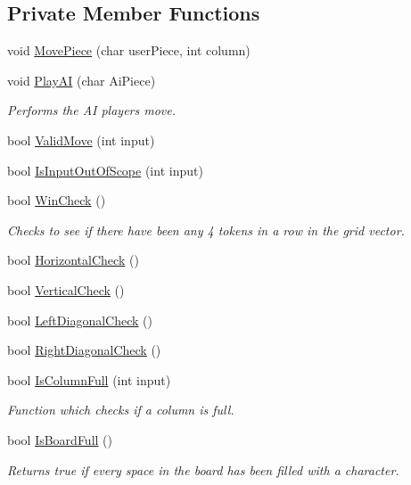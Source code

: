 \subsection*{Private Member Functions}
\begin{DoxyCompactItemize}
\item 
void \hyperlink{classConnectFour_a6bde7d38a9493ea5475a0a941f4c96df}{Move\-Piece} (char user\-Piece, int column)
\item 
void \hyperlink{classConnectFour_a618f3caa7db76bc8b4832a2338967a5b}{Play\-A\-I} (char Ai\-Piece)
\begin{DoxyCompactList}\small\item\em Performs the A\-I players move. \end{DoxyCompactList}\item 
bool \hyperlink{classConnectFour_a1cbd5ba040359e265c85a27407528915}{Valid\-Move} (int input)
\item 
bool \hyperlink{classConnectFour_a5e33120d5b6a49e8eacd976de8be9c7c}{Is\-Input\-Out\-Of\-Scope} (int input)
\item 
bool \hyperlink{classConnectFour_a4f7dd5550d9ba548c542d887822cc1f0}{Win\-Check} ()
\begin{DoxyCompactList}\small\item\em Checks to see if there have been any 4 tokens in a row in the grid vector. \end{DoxyCompactList}\item 
bool \hyperlink{classConnectFour_aad3b75c20b82a21fcbe648e7ee134a4b}{Horizontal\-Check} ()
\item 
bool \hyperlink{classConnectFour_afe5fd24730a5d1295c1bb20fc2e6c1a8}{Vertical\-Check} ()
\item 
bool \hyperlink{classConnectFour_acacb2e213d7c4f6dec2cf2f9d3c370f9}{Left\-Diagonal\-Check} ()
\item 
bool \hyperlink{classConnectFour_ac49d716bde974c19aab3e47e66d94073}{Right\-Diagonal\-Check} ()
\item 
bool \hyperlink{classConnectFour_a26d75c9c50d6424df11de765086edc8a}{Is\-Column\-Full} (int input)
\begin{DoxyCompactList}\small\item\em Function which checks if a column is full. \end{DoxyCompactList}\item 
bool \hyperlink{classConnectFour_a408b2a0222e08488c258e4225ba5b8f6}{Is\-Board\-Full} ()
\begin{DoxyCompactList}\small\item\em Returns true if every space in the board has been filled with a character. \end{DoxyCompactList}\item 

\end{DoxyCompactItemize}
